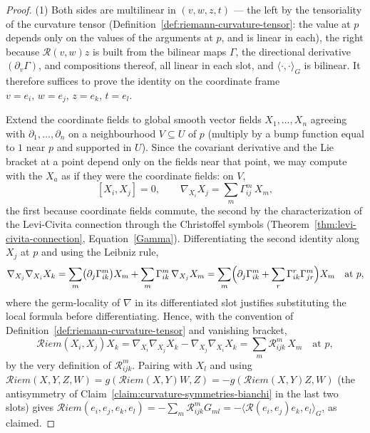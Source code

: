 \begin{proof}
\leanok
{}
(1) Both sides are multilinear in $(v,w,z,t)$ — the left by the
tensoriality of the curvature tensor
(Definition~\ref{def:riemann-curvature-tensor}: the value at $p$
depends only on the values of the arguments at $p$, and is linear in
each), the right because ${\mathcal R}(v,w)z$ is built from the
bilinear maps $\Gamma$, the directional derivative
$(\partial_v\Gamma)$, and compositions thereof, all linear in each
slot, and $\langle\cdot,\cdot\rangle_G$ is bilinear. It therefore
suffices to prove the identity on the coordinate frame
$v=e_i,\,w=e_j,\,z=e_k,\,t=e_l$.

Extend the coordinate fields to global smooth vector fields
$X_1,\ldots,X_n$ agreeing with $\partial_1,\ldots,\partial_n$ on a
neighbourhood $V\subseteq U$ of $p$ (multiply by a bump function
equal to $1$ near $p$ and supported in $U$). Since the covariant
derivative and the Lie bracket at a point depend only on the fields
near that point, we may compute with the $X_a$ as if they were the
coordinate fields: on $V$,
$$[X_i,X_j]=0,\qquad
\nabla_{X_i}X_j=\sum_m\Gamma^m_{ij}\,X_m,$$
the first because coordinate fields commute, the second by the
characterization of the Levi-Civita connection through the
Christoffel symbols (Theorem~\ref{thm:levi-civita-connection},
Equation~\eqref{Gamma}). Differentiating the second identity along
$X_j$ at $p$ and using the Leibniz rule,
$$\nabla_{X_j}\nabla_{X_i}X_k
=\sum_m\bigl(\partial_j\Gamma^m_{ik}\bigr)X_m
+\sum_m\Gamma^m_{ik}\,\nabla_{X_j}X_m
=\sum_m\Bigl(\partial_j\Gamma^m_{ik}
+\sum_r\Gamma^r_{ik}\Gamma^m_{jr}\Bigr)X_m
\quad\text{at }p,$$
where the germ-locality of $\nabla$ in its differentiated slot
justifies substituting the local formula before differentiating.
Hence, with the convention of
Definition~\ref{def:riemann-curvature-tensor} and vanishing bracket,
$${\mathcal R}iem(X_i,X_j)X_k
=\nabla_{X_i}\nabla_{X_j}X_k-\nabla_{X_j}\nabla_{X_i}X_k
=\sum_m{\mathcal R}^m_{ijk}\,X_m\quad\text{at }p,$$
by the very definition of ${\mathcal R}^m_{ijk}$. Pairing with
$X_l$ and using
${\mathcal R}iem(X,Y,Z,W)=g({\mathcal R}iem(X,Y)W,Z)
=-g({\mathcal R}iem(X,Y)Z,W)$ (the antisymmetry of
Claim~\ref{claim:curvature-symmetries-bianchi} in the last two
slots) gives
${\mathcal R}iem(e_i,e_j,e_k,e_l)
=-\sum_m{\mathcal R}^m_{ijk}G_{ml}
=-\langle{\mathcal R}(e_i,e_j)e_k,e_l\rangle_G$, as claimed.


\end{proof}

